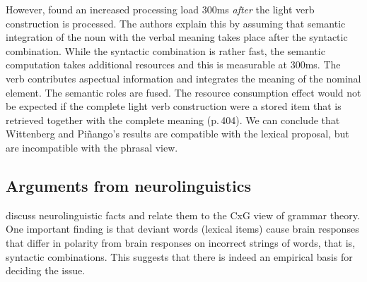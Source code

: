 \begin{exe}
\begin{xlist}[iv.]
\begin{exe}
\begin{xlist}[iv.]
However, \citet{WP2011a} found an increased processing load 300ms \emph{after} the light verb construction is
processed. The authors explain this by assuming that semantic integration of the noun with the
verbal meaning takes place after the syntactic
combination. While the syntactic combination is rather fast, the semantic computation takes
additional resources and this is measurable at 300ms. The verb contributes aspectual information and integrates
the meaning of the nominal element. The semantic roles are fused. The resource consumption effect
would not be expected if the complete light verb construction were a stored item that is
retrieved together with the complete meaning (p.\,404). We can conclude that Wittenberg and
Piñango's results are compatible with the lexical proposal, but are
incompatible with the phrasal view. %


\subsection{Arguments from neurolinguistics}
\label{sec-neuro-linguistics}


\mbox{}\citet*{PCShandbookCxG} discuss neurolinguistic facts and relate them to the CxG view of grammar
theory. One important finding is that deviant words (lexical items) cause brain responses that differ in polarity
from brain responses on incorrect strings of words, that is, syntactic combinations. This suggests
that there is indeed an empirical basis for deciding the issue.


\end{xlist}
\end{exe}
\end{xlist}
\end{exe}
